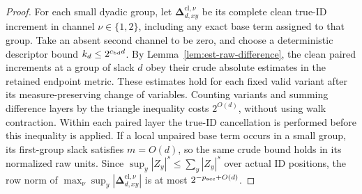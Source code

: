 \documentclass[11pt]{article}
\numberwithin{equation}{section}
\theoremstyle{definition}
\theoremstyle{remark}
\begin{document}
\begin{proof}
For each small dyadic group, let $\boldsymbol{\Delta}_{d,xy}^{\mathrm{cl},\nu}$ be
its complete clean true-ID increment in channel $\nu\in\{1,2\}$,
including any exact base term assigned to that group.  Take an absent second channel
to be zero, and choose a deterministic descriptor bound $k_d\le2^{{c_{\rm bd}}d}$.
By Lemma~\ref{lem:est-raw-difference}, the clean paired increments at a
group of slack $d$ obey their crude absolute estimates in the retained
endpoint metric.  These estimates hold for each fixed valid variant
after its measure-preserving change of variables.  Counting variants
and summing difference layers by the triangle inequality costs
$2^{O(d)}$, without using walk contraction.  Within each paired layer
the true-ID cancellation is performed before this inequality is
applied.  If a local unpaired base term occurs in a small group, its
first-group slack satisfies ${m}=O(d)$, so the same crude bound holds in
its normalized raw units.  Since $\sup_y|Z_y|^s\le\sum_y|Z_y|^s$ over actual ID
positions, the row norm of
$\max_\nu\sup_y|\boldsymbol{\Delta}_{d,xy}^{\mathrm{cl},\nu}|$ is at most
$2^{-{p_{\rm acc}}+O(d)}$.


\end{proof}
\end{document}
